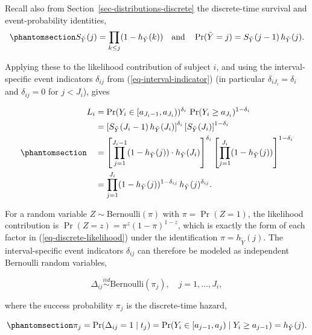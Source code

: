 \documentclass[
  letterpaper,
  krantz2]{style/krantz}
\begin{document}
Recall also from Section~\ref{sec-distributions-discrete} the
discrete-time survival and event-probability identities,
\begin{equation}\phantomsection\label{eq-discrete-survival}{
S_{\tilde{Y}}(j) = \prod_{k \leq j}(1 - h_{\tilde{Y}}(k)) \quad\text{and}\quad \Pr(\tilde{Y} = j) = S_{\tilde{Y}}(j-1)\, h_{\tilde{Y}}(j).
}\end{equation}

Applying these to the likelihood contribution of subject \(i\), and
using the interval-specific event indicators \(\delta_{ij}\) from
(\ref{eq-interval-indicator}) (in particular
\(\delta_{iJ_i} = \delta_i\) and \(\delta_{ij}=0\) for \(j<J_i\)), gives

\begin{equation}\phantomsection\label{eq-discrete-likelihood}{\begin{aligned}
L_i
&= \Pr(Y_i \in [a_{J_i-1}, a_{J_i}))^{\delta_i}\, \Pr(Y_i \geq a_{J_i})^{1-\delta_i}\\
&= \left[S_{\tilde{Y}}(J_i-1)\, h_{\tilde{Y}}(J_i)\right]^{\delta_i} \left[S_{\tilde{Y}}(J_i)\right]^{1-\delta_i}\\
&= \left[\prod_{j=1}^{J_i-1} (1-h_{\tilde{Y}}(j)) \cdot h_{\tilde{Y}}(J_i)\right]^{\delta_i} \left[\prod_{j=1}^{J_i} (1-h_{\tilde{Y}}(j))\right]^{1-\delta_i}\\
&= \prod_{j=1}^{J_i} (1-h_{\tilde{Y}}(j))^{1-\delta_{ij}}\, h_{\tilde{Y}}(j)^{\delta_{ij}}.
\end{aligned}
}\end{equation}

For a random variable \(Z \sim \text{Bernoulli}(\pi)\) with
\(\pi = \Pr(Z = 1)\), the likelihood contribution is
\(\Pr(Z = z) = \pi^z (1-\pi)^{1-z}\), which is exactly the form of each
factor in (\ref{eq-discrete-likelihood}) under the identification
\(\pi = h_{\tilde{Y}}(j)\). The interval-specific event indicators
\(\delta_{ij}\) can therefore be modeled as independent Bernoulli random
variables,

\[
\Delta_{ij} \stackrel{iid}{\sim} \text{Bernoulli}(\pi_j), \quad j = 1, \ldots, J_i,
\]

where the success probability \(\pi_j\) is the discrete-time hazard,

\begin{equation}\phantomsection\label{eq-discrete-hazard-probability}{
\pi_j = \Pr(\Delta_{ij} = 1 \mid t_j) = \Pr(Y_i \in [a_{j-1}, a_j) \mid Y_i \geq a_{j-1}) = h_{\tilde{Y}}(j).
}\end{equation}
\end{document}
